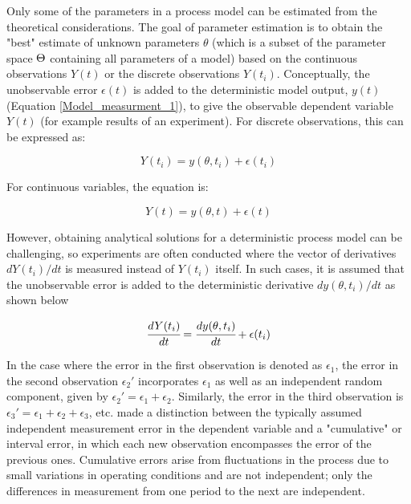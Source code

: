 \documentclass[../Article_Model_Parameters.tex]{subfiles}
\begin{document}
	Only some of the parameters in a process model can be estimated from the theoretical considerations. The goal of parameter estimation is to obtain the "best" estimate of unknown parameters $\theta$ (which is a subset of the parameter space ${\color{black}\Theta}$ containing all parameters of a model) based on the continuous observations $Y(t)$ or the discrete observations $Y(t_i)$. Conceptually, the unobservable error $\epsilon(t)$ is added to the deterministic model output, $y(t)$ (Equation \ref{Model_measurment_1}), to give the observable dependent variable $Y(t)$ (for example results of an experiment). For discrete observations, this can be expressed as:
	
	{\footnotesize
		\begin{equation*}
			Y(t_i) = y(\theta, t_i) + \epsilon(t_i)
	\end{equation*} }
	
	For continuous variables, the equation is:
	
	{\footnotesize
		\begin{equation*}
			Y(t) = y(\theta, t) + \epsilon(t)
	\end{equation*} }
	
	However, obtaining analytical solutions for a deterministic process model can be challenging, so experiments are often conducted where the vector of derivatives $dY(t_i)/dt$ is measured instead of $Y(t_i)$ itself. In such cases, it is assumed that the unobservable error is added to the deterministic derivative $dy(\theta, t_i)/dt$ as shown below
	
	{\footnotesize
		\begin{equation}  \label{EQ: Measurment_noise}
			\cfrac{d Y(t_i)}{dt} = \cfrac{dy(\theta, t_i)}{dt} + \epsilon(t_i)
	\end{equation} }
	
	In the case where the error in the first observation is denoted as $\epsilon_1$, the error in the second observation $\epsilon_2'$ incorporates $\epsilon_1$ as well as an independent random component, given by $\epsilon_2' = \epsilon_1 + \epsilon_2$. Similarly, the error in the third observation is $\epsilon_3' = \epsilon_1 + \epsilon_2 + \epsilon_3$, etc. \citet{Mandel1957}  made a distinction between the typically assumed independent measurement error in the dependent variable and a "cumulative" or interval error, in which each new observation encompasses the error of the previous ones. Cumulative errors arise from fluctuations in the process due to small variations in operating conditions and are not independent; only the differences in measurement from one period to the next are independent.
	
\end{document}
